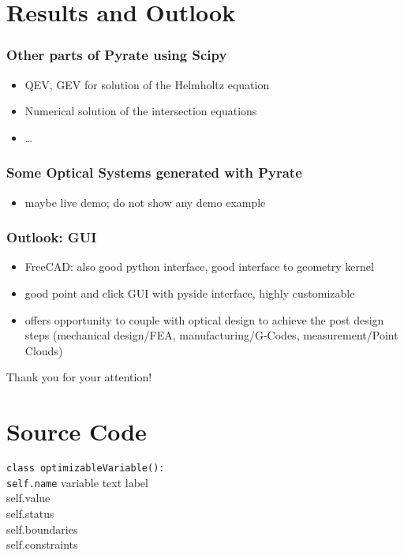 \documentclass[
10pt,
]{beamer}
\newcommand{\remark}[1]{{\color{red}{#1}}}
\begin{document}
\section{Results and Outlook}

\begin{frame}
 \frametitle{Other parts of Pyrate using Scipy}
  \begin{itemize}
   \item QEV, GEV for solution of the Helmholtz equation
   \item Numerical solution of the intersection equations
   \item \dots
  \end{itemize}

\end{frame}


\begin{frame}
 \frametitle{Some Optical Systems generated with Pyrate}
 \begin{itemize}
  \item maybe live demo; do not show any demo example
 \end{itemize}

\end{frame}

\begin{frame}
 \frametitle{Outlook: GUI}
 \begin{itemize}
  \item FreeCAD: also good python interface, good interface to geometry kernel
  \item good point and click GUI with pyside interface, highly customizable
  \item offers opportunity to couple with optical design to achieve the post design steps
    (mechanical design/FEA, manufacturing/G-Codes, measurement/Point Clouds)
 \end{itemize}

\end{frame}

\begin{frame}
 \begin{center}
  Thank you for your attention!\remark{nice picture}
 \end{center}
\end{frame}


\section{Source Code}

\begin{frame}
\texttt{class optimizableVariable():}\\
\texttt{self.name} variable text label\\
self.value\\
self.status\\
self.boundaries\\
self.constraints
\end{frame}
\end{document}
